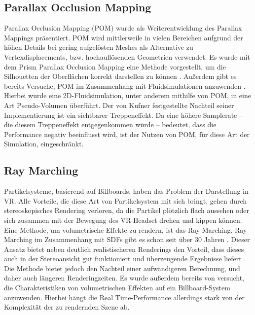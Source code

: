 \subsection{Parallax Occlusion Mapping}
Parallax Occlusion Mapping (POM) \parencite{Brawley2004} wurde als Weiterentwicklung des Parallax Mappings \parencite{Kaneko2001} präsentiert.
POM wird mittlerweile in vielen Bereichen aufgrund der höhen Details bei gering aufgelösten Meshes \parencite{Tatarchuk2006} als 
Alternative zu Vertexdisplacements, bzw. hochauflösenden Geometrien verwendet. Es wurde mit dem Prism Parallax Occlusion Mapping
eine Methode vorgestellt, um die Silhouetten der Oberflächen korrekt darstellen zu können \parencite{Dachsbacher2007}. 
Außerdem gibt es bereits Versuche, POM im Zusammenhang mit Fluidsimulationen 
anzuwenden \parencite{Kufner2017}. Hierbei wurde eine 2D-Fluidsimulation, unter anderem mithilfe von POM, in eine Art Pseudo-Volumen überführt. 
Der von Kufner festgestellte Nachteil seiner Implementierung ist ein sichtbarer Treppeneffekt. Da eine höhere Samplerate – die diesem 
Treppeneffekt entgegenkommen würde – bedeutet, dass die Performance negativ beeinflusst wird, ist der Nutzen von POM, für diese 
Art der Simulation, eingeschränkt.



\subsection{Ray Marching}

Partikelsysteme, basierend auf Billboards, haben das Problem der Darstellung in VR. Alle Vorteile, die diese Art von 
Partikelsystem mit sich bringt, gehen durch stereoskopisches Rendering verloren, da die Partikel plötzlich flach aussehen 
oder sich zusammen mit der Bewegung des VR-Headset drehen und kippen können.
Eine Methode, um volumetrische Effekte zu rendern, ist das Ray Marching. Ray Marching im Zusammenhang mit SDFs gibt es 
schon seit über 30 Jahren \parencite{Hart1989}.
Dieser Ansatz bietet neben deutlich realistischeren Renderings den Vorteil, dass dieses 
auch in der Stereoansicht gut funktioniert und überzeugende Ergebnisse liefert \parencite{Wald2006}. Die Methode bietet 
jedoch den Nachteil einer aufwändigeren Berechnung, und daher auch längeren Renderingzeiten. Es wurde außerdem bereits von 
\textcite{Zhang2020} versucht, die Charakteristiken von volumetrischen Effekten auf ein Billboard-System anzuwenden. 
Hierbei hängt die Real Time-Performance allerdings stark von der Komplexität der zu rendernden Szene ab.